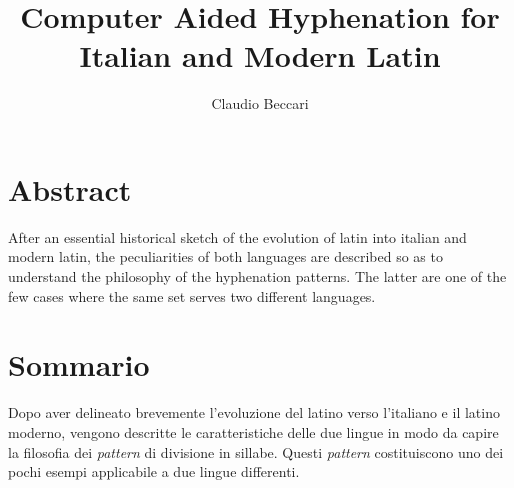 %
\title{Computer Aided Hyphenation for Italian and Modern Latin}
\author{Claudio Beccari}
\address{Dipartimento di Elettronica\\Politecnico di Torino\\ Turin, Italy}
%
%
\newenvironment{comment}{\begingroup\setbox0\vbox\bgroup}{\egroup\endgroup}
%
%
\newenvironment{trecolonne}{%
\hbadness=10000 \vbadness=10000
\widowpenalty=0 \clubpenalty=0%
\dimen0=\textwidth \advance\dimen0 -2\columnsep
\divide\dimen0 by 3
\setbox0\vbox\bgroup\hsize\dimen0\parindent 1em
bbbb\par
}{%
\par\egroup
\setbox0=\vbox{\unvbox0\null}
\setbox6\vsplit0 to \baselineskip
\count255\ht0 \divide\count255 by \baselineskip \divide\count255 by 3
\dimen2=\count255\baselineskip \advance\dimen2\topskip
\global\setbox2\vsplit0 to\dimen2
\setbox2\vbox{\unvbox2}
\ifdim\ht2<\dimen2 \setbox2\vbox{\unvbox2\vsplit0 to \topskip}\fi
\global\setbox4\vsplit0 to\dimen2
\setbox4\vbox{\unvbox4}
\ifdim\ht4<\dimen2 \setbox4\vbox{\unvbox4\vsplit0 to \topskip}\fi
\setbox2\vtop{\unvbox2}
\setbox4\vtop{\unvbox4}
\setbox6\vtop{\unvbox0}
\noindent\box2 \hfill \box4 \hfill \box6}%
%
\let \italiano\relax \let\latino\relax


\maketitle
\section*{Abstract}
After  an essential historical sketch of the evolution of latin into italian
and modern latin, the peculiarities of both languages are described so as to
understand the philosophy of the hyphenation patterns. The latter are one of
the few cases where the same set serves two different languages.

\section*{Sommario}  Dopo  aver delineato brevemente l'evoluzione del latino
verso l'italiano e il latino moderno, vengono descritte  le  caratteristiche
delle  due  lingue  in  modo  da  capire  la  filosofia dei {\it pattern} di
divisione in sillabe. Questi  {\it  pattern}  costituiscono  uno  dei  pochi
esem\-pi applicabile a due lingue differenti.

